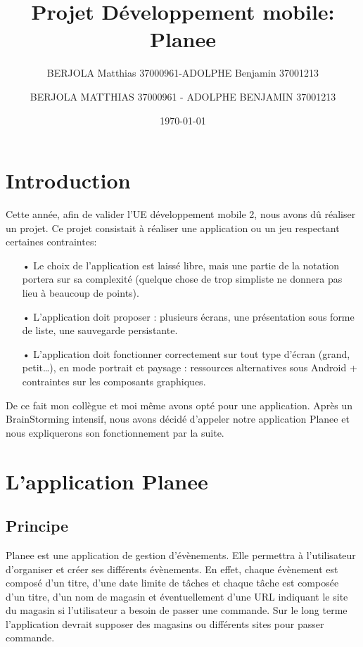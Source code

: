 \documentclass[12pt,a4paper]{report}
\author{BERJOLA Matthias 37000961-ADOLPHE Benjamin 37001213}           %
\begin{document}
\title{Projet Développement mobile: Planee}
\author{BERJOLA MATTHIAS 37000961 - ADOLPHE BENJAMIN 37001213}
\date{\today} 

\maketitle


\newpage

\tableofcontents

\chapter{Introduction}  
\begin{flushleft}
\justify
Cette année, afin de valider l'UE développement mobile 2, nous avons dû réaliser un projet. Ce projet consistait à réaliser une application ou un jeu respectant certaines contraintes:
\begin{itemize}
\item[•] Le choix de l'application est laissé libre, mais une partie de la notation portera sur sa complexité (quelque chose de trop simpliste ne donnera pas lieu à beaucoup de points).
\item[•] L’application doit proposer : plusieurs écrans, une présentation
sous forme de liste, une sauvegarde persistante.
\item[•] L’application doit fonctionner correctement sur tout type d’écran (grand, petit…), en mode portrait et paysage : ressources alternatives sous Android + contraintes sur les composants graphiques.
\end{itemize}
De ce fait mon collègue et moi même avons opté pour une application. Après un BrainStorming intensif, nous avons décidé d'appeler notre application Planee et nous expliquerons son fonctionnement par la suite.
\end{flushleft}

\newpage
\chapter{L'application Planee}
\section{Principe}
\begin{flushleft}
\justify
Planee est une application de gestion d'évènements. Elle permettra à l'utilisateur d'organiser et créer ses différents évènements. En effet, chaque évènement est composé d'un titre, d'une date limite de tâches et chaque tâche est composée d'un titre, d'un nom de magasin et éventuellement d'une URL indiquant le site du magasin si l'utilisateur a besoin de passer une commande. Sur le long terme l'application devrait supposer des magasins ou différents sites pour passer commande.
\end{flushleft}
\end{document}
